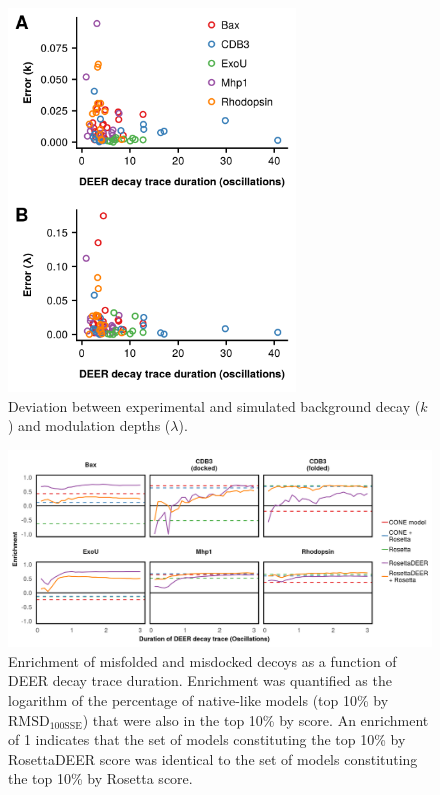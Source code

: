 \begin{figure}[h]
\centering
\includegraphics[width=3in]{Figures/rosettadeer_supp_oscillations.pdf}
 \caption[Deviation between experimental and simulated background decay ($k$) and modulation depths ($\lambda$).]{Deviation between experimental and simulated background decay ($k$) and modulation depths ($\lambda$).}
\label{fig:rosettadeer_supp_oscillations}
\end{figure}

\begin{figure}[h]
\centering
\includegraphics[width=5.5in]{Figures/rosettadeer_supp_oscillation_decoys.pdf}
 \caption[Enrichment of misfolded and misdocked decoys as a function of DEER decay trace duration.]{Enrichment of misfolded and misdocked decoys as a function of DEER decay trace duration. Enrichment was quantified as the logarithm of the percentage of native-like models (top 10\% by $\mathrm{RMSD_{100SSE}}$) that were also in the top 10\% by score. An enrichment of 1 indicates that the set of models constituting the top 10\% by RosettaDEER score was identical to the set of models constituting the top 10\% by Rosetta score.}
\label{fig:rosettadeer_supp_oscillation_decoys}
\end{figure}

